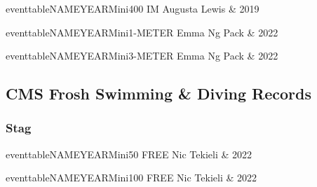 \begin{minipage}[t]{0.44\textwidth}
\centering
eventtableNAMEYEARMini{400 IM}{
Augusta Lewis & 2019 \\
}
\end{minipage}\hfill
\begin{minipage}[t]{0.44\textwidth}
\centering

\end{minipage}

\vspace{0.3cm}

\begin{minipage}[t]{0.44\textwidth}
\centering
eventtableNAMEYEARMini{1-METER}{
Emma Ng Pack & 2022 \\
}
\end{minipage}\hfill
\begin{minipage}[t]{0.44\textwidth}
\centering

\end{minipage}

\vspace{0.3cm}

\begin{minipage}[t]{0.44\textwidth}
\centering
eventtableNAMEYEARMini{3-METER}{
Emma Ng Pack & 2022 \\
}
\end{minipage}\hfill
\begin{minipage}[t]{0.44\textwidth}
\centering

\end{minipage}

\vspace{0.3cm}

\newpage

\subsection{CMS Frosh Swimming & Diving Records}
\subsubsection{Stag}

\begin{minipage}[t]{0.44\textwidth}
\centering
eventtableNAMEYEARMini{50 FREE}{
Nic Tekieli & 2022 \\
}
\end{minipage}\hfill
\begin{minipage}[t]{0.44\textwidth}
\centering
eventtableNAMEYEARMini{100 FREE}{
Nic Tekieli & 2022 \\
}
\end{minipage}

